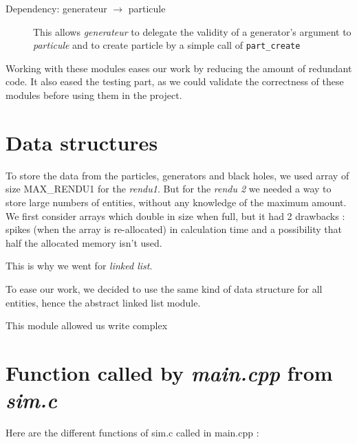 \documentclass[a4paper]{article} %
\begin{document}
\begin{multicols*}{2}
\begin{description}
\item[Dependency: generateur $\rightarrow$ particule]
This allows \emph{generateur} to delegate the validity of a generator's argument to \emph{particule}
and to create particle by a simple call of \texttt{part\_create}
\end{description}

Working with these modules eases our work by reducing the amount of redundant code.
It also eased the testing part, as we could validate the correctness of these modules before using them in the project.

\section{Data structures}

To store the data from the particles, generators and black holes,
we used array of size MAX\_RENDU1 for the \emph{rendu1}.
But for the \emph{rendu 2} we needed a way to store large numbers of entities,
without any knowledge of the maximum amount.
We first consider arrays which double in size when full, but it had 2 drawbacks :
spikes (when the array is re-allocated) in calculation time
and a possibility that half the allocated memory isn't used.

This is why we went for \emph{linked list}.

To ease our work, we decided to use the same kind of data structure for all entities,
hence the abstract linked list module.

This module allowed us write complex 


\section{Function called by \emph{main.cpp} from \emph{sim.c}}
Here are the different functions of sim.c called in main.cpp :


\end{multicols*}
\end{document}
